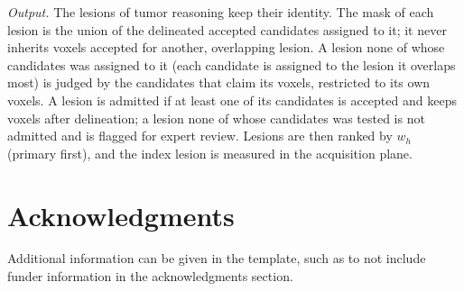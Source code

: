\documentclass[fleqn,10pt]{olplainarticle}
\begin{document}
\textit{Output.} The lesions of tumor reasoning keep their identity. The mask of each lesion is the union of the delineated
accepted candidates assigned to it; it never inherits voxels accepted for another, overlapping lesion. A lesion none of
whose candidates was assigned to it (each candidate is assigned to the lesion it overlaps most) is judged by the candidates
that claim its voxels, restricted to its own voxels. A lesion is admitted if at least one of its candidates is accepted and
keeps voxels after delineation; a lesion none of whose candidates was tested is not admitted and is flagged for expert
review. Lesions are then ranked by $w_h$ (primary first), and the index lesion is measured in the acquisition plane.


\section*{Acknowledgments}

Additional information can be given in the template, such as to not include funder information in the acknowledgments section.


\end{document}
